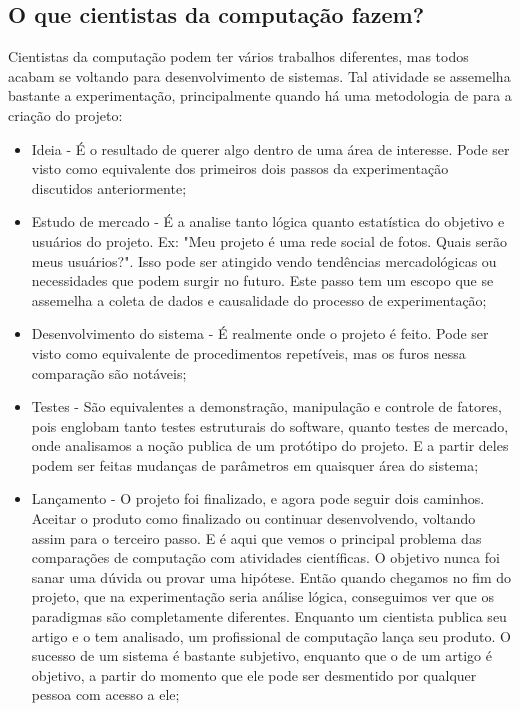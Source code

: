 \subsection{O que cientistas da computação fazem?}
    Cientistas da computação podem ter vários trabalhos diferentes, mas todos acabam se voltando para desenvolvimento de sistemas. Tal atividade se assemelha bastante a experimentação, principalmente quando há uma metodologia de para a criação do projeto:
    \begin{itemize}
        \item Ideia - É o resultado de querer algo dentro de uma área de interesse. Pode ser visto como equivalente dos primeiros dois passos da experimentação discutidos anteriormente;
        \item Estudo de mercado - É a analise tanto lógica quanto estatística do objetivo e usuários do projeto. Ex: "Meu projeto é uma rede social de fotos. Quais serão meus usuários?". Isso pode ser atingido vendo tendências mercadológicas ou necessidades que podem surgir no futuro. Este passo tem um escopo que se assemelha a coleta de dados e causalidade do processo de experimentação;
        \item Desenvolvimento do sistema - É realmente onde o projeto é feito. Pode ser visto como equivalente de procedimentos repetíveis, mas os furos nessa comparação são notáveis;
        \item Testes - São equivalentes a demonstração, manipulação e controle de fatores, pois englobam tanto testes estruturais do software, quanto testes de mercado, onde analisamos a noção publica de um protótipo do projeto. E a partir deles podem ser feitas mudanças de parâmetros em quaisquer área do sistema;
        \item Lançamento - O projeto foi finalizado, e agora pode seguir dois caminhos. Aceitar o produto como finalizado ou continuar desenvolvendo, voltando assim para o terceiro passo. E é aqui que vemos o principal problema das comparações de computação com atividades científicas. O objetivo nunca foi sanar uma dúvida ou provar uma hipótese. Então quando chegamos no fim do projeto, que na experimentação seria análise lógica, conseguimos ver que os paradigmas são completamente diferentes. Enquanto um cientista publica seu artigo e o tem analisado, um profissional de computação lança seu produto. O sucesso de um sistema é bastante subjetivo, enquanto que o de um artigo é objetivo, a partir do momento que ele pode ser desmentido por qualquer pessoa com acesso a ele;
    \end{itemize}

